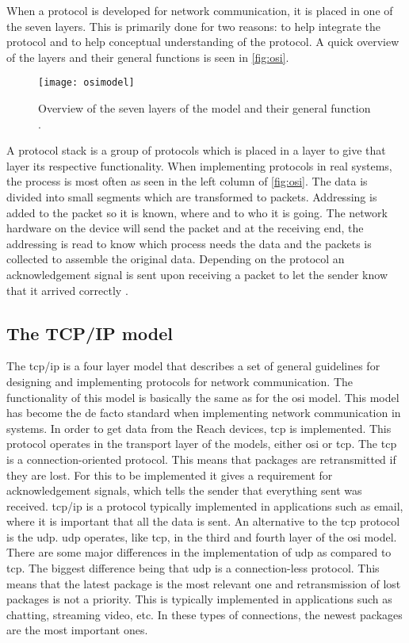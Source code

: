 When a protocol is developed for network communication, it is placed in one of the seven layers. This is primarily done for two reasons: to help integrate the protocol and to help conceptual understanding of the protocol. A quick overview of the layers and their general functions is seen in \autoref{fig:osi}.

\begin{figure}[h]%
\centering
\texttt{[image: osimodel]}%
\caption{Overview of the seven layers of the  model and their general function \citep{tech-faq}.}%
\label{fig:osi}%
\end{figure}

A protocol stack is a group of protocols which is placed in a layer to give that layer its respective functionality. When implementing protocols in real systems, the process is most often as seen in the left column of \autoref{fig:osi}. The data is divided into small segments which are transformed to packets. Addressing is added to the packet so it is known, where and to who it is going. The network hardware on the device will send the packet and at the receiving end, the addressing is read to know which process needs the data and the packets is collected to assemble the original data. Depending on the protocol an acknowledgement signal is sent upon receiving a packet to let the sender know that it arrived correctly \citep{tech-faq}.

\subsection{The TCP/IP model}
The \gls{tcp}/\gls{ip} is a four layer model that describes a set of general guidelines for designing and implementing protocols for network communication. The functionality of this model is basically the same as for the \gls{osi} model. This model has become the de facto standard when implementing network communication in systems. In order to get data from the Reach devices, \gls{tcp} is implemented. This protocol operates in the transport layer of the models, either \gls{osi} or \gls{tcp}. The \gls{tcp} is a connection-oriented protocol. This means that packages are retransmitted if they are lost. For this to be implemented it gives a requirement for acknowledgement signals, which tells the sender that everything sent was received. \gls{tcp}/\gls{ip} is a protocol typically implemented in applications such as email, where it is important that all the data is sent. An alternative to the \gls{tcp} protocol is the \gls{udp}. \gls{udp} operates, like \gls{tcp}, in the third and fourth layer of the \gls{osi} model. There are some major differences in the implementation of \gls{udp} as compared to \gls{tcp}. The biggest difference being that \gls{udp} is a connection-less protocol. This means that the latest package is the most relevant one and retransmission of lost packages is not a priority. This is typically implemented in applications such as chatting, streaming video, etc. In these types of connections, the newest packages are the most important ones.

